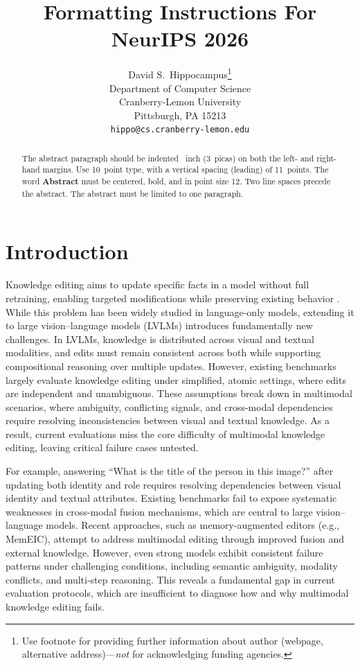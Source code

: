 \documentclass{article}
\title{Formatting Instructions For NeurIPS 2026}
\author{%
  David S.~Hippocampus\thanks{Use footnote for providing further information
    about author (webpage, alternative address)---\emph{not} for acknowledging
    funding agencies.} \\
  Department of Computer Science\\
  Cranberry-Lemon University\\
  Pittsburgh, PA 15213 \\
  \texttt{hippo@cs.cranberry-lemon.edu} \\
}
\begin{document}
\maketitle


\begin{abstract}
  The abstract paragraph should be indented ~inch (3~picas) on both the left- and right-hand margins. Use 10~point type, with a vertical spacing (leading) of 11~points. The word \textbf{Abstract} must be centered, bold, and in point size 12. Two line spaces precede the abstract. The abstract must be limited to one paragraph.
\end{abstract}



\section{Introduction}
\label{sec:intro}


Knowledge editing aims to update specific facts in a model without full retraining, enabling targeted modifications while preserving existing behavior \cite{editing23,easyedit24,KE_24survey}. While this problem has been widely studied in language-only models, extending it to large vision--language models (LVLMs) \cite{BLIP-2_2023,minigpt24} introduces fundamentally new challenges. In LVLMs, knowledge is distributed across visual and textual modalities, and edits must remain consistent across both while supporting compositional reasoning over multiple updates. However, existing benchmarks largely evaluate knowledge editing under simplified, atomic settings, where edits are independent and unambiguous. These assumptions break down in multimodal scenarios, where ambiguity, conflicting signals, and cross-modal dependencies require resolving inconsistencies between visual and textual knowledge. As a result, current evaluations miss the core difficulty of multimodal knowledge editing, leaving critical failure cases untested.

\par For example, answering ``What is the title of the person in this image?'' after updating both identity and role requires resolving dependencies between visual identity and textual attributes. Existing benchmarks fail to expose systematic weaknesses in cross-modal fusion mechanisms, which are central to large vision--language models. Recent approaches, such as memory-augmented editors (e.g., MemEIC), attempt to address multimodal editing through improved fusion and external knowledge. However, even strong models exhibit consistent failure patterns under challenging conditions, including semantic ambiguity, modality conflicts, and multi-step reasoning. This reveals a fundamental gap in current evaluation protocols, which are insufficient to diagnose how and why multimodal knowledge editing fails.
\end{document}
